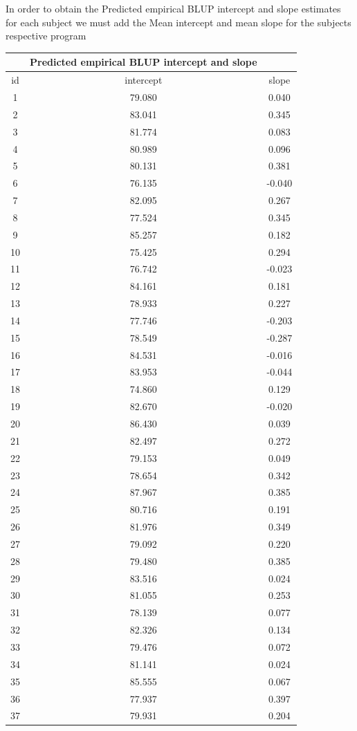 \documentclass{article}
\begin{document}
\begin{flushleft}
In order to obtain the Predicted empirical BLUP intercept and slope estimates for each subject we must add the Mean intercept and  mean slope for the subjects respective program\\
\begin{tabular}{ccc}
	\hline
	&Predicted empirical BLUP intercept and slope\\
	\hline
	id & intercept & slope \\ 
	\hline
	1 & 79.080 & 0.040 \\ 
	2 & 83.041 & 0.345 \\ 
	3 & 81.774 & 0.083 \\ 
	4 & 80.989 & 0.096 \\ 
	5 & 80.131 & 0.381 \\ 
	6 & 76.135 & -0.040 \\ 
	7 & 82.095 & 0.267 \\ 
	8 & 77.524 & 0.345 \\ 
	9 & 85.257 & 0.182 \\ 
	10 & 75.425 & 0.294 \\ 
	11 & 76.742 & -0.023 \\ 
	12 & 84.161 & 0.181 \\ 
	13 & 78.933 & 0.227 \\ 
	14 & 77.746 & -0.203 \\ 
	15 & 78.549 & -0.287 \\ 
	16 & 84.531 & -0.016 \\ 
	17 & 83.953 & -0.044 \\ 
	18 & 74.860 & 0.129 \\ 
	19 & 82.670 & -0.020 \\ 
	20 & 86.430 & 0.039 \\ 
	21 & 82.497 & 0.272 \\ 
	22 & 79.153 & 0.049 \\ 
	23 & 78.654 & 0.342 \\ 
	24 & 87.967 & 0.385 \\ 
	25 & 80.716 & 0.191 \\ 
	26 & 81.976 & 0.349 \\ 
	27 & 79.092 & 0.220 \\ 
	28 & 79.480 & 0.385 \\ 
	29 & 83.516 & 0.024 \\ 
	30 & 81.055 & 0.253 \\ 
	31 & 78.139 & 0.077 \\ 
	32 & 82.326 & 0.134 \\ 
	33 & 79.476 & 0.072 \\ 
	34 & 81.141 & 0.024 \\ 
	35 & 85.555 & 0.067 \\ 
	36 & 77.937 & 0.397 \\ 
	37 & 79.931 & 0.204 \\ 
	\hline
\end{tabular}

\end{flushleft}
\end{document}
